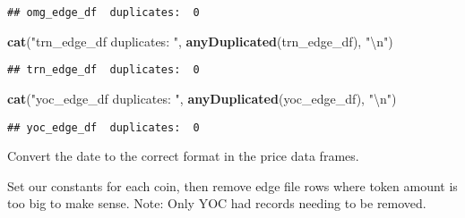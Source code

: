\documentclass[]{article}
\newenvironment{Shaded}{\begin{snugshade}}{\end{snugshade}}
\newcommand{\KeywordTok}[1]{\textcolor[rgb]{0.13,0.29,0.53}{\textbf{#1}}}
\newcommand{\DataTypeTok}[1]{\textcolor[rgb]{0.13,0.29,0.53}{#1}}
\newcommand{\CharTok}[1]{\textcolor[rgb]{0.31,0.60,0.02}{#1}}
\newcommand{\StringTok}[1]{\textcolor[rgb]{0.31,0.60,0.02}{#1}}
\newcommand{\OperatorTok}[1]{\textcolor[rgb]{0.81,0.36,0.00}{\textbf{#1}}}
\newcommand{\NormalTok}[1]{#1}
\begin{document}
\begin{verbatim}
## omg_edge_df  duplicates:  0
\end{verbatim}

\begin{Shaded}
\begin{Highlighting}[]
\KeywordTok{cat}\NormalTok{(}\StringTok{"trn_edge_df  duplicates: "}\NormalTok{, }\KeywordTok{anyDuplicated}\NormalTok{(trn_edge_df),  }\StringTok{"}\CharTok{\textbackslash{}n}\StringTok{"}\NormalTok{)}
\end{Highlighting}
\end{Shaded}

\begin{verbatim}
## trn_edge_df  duplicates:  0
\end{verbatim}

\begin{Shaded}
\begin{Highlighting}[]
\KeywordTok{cat}\NormalTok{(}\StringTok{"yoc_edge_df  duplicates: "}\NormalTok{, }\KeywordTok{anyDuplicated}\NormalTok{(yoc_edge_df),  }\StringTok{"}\CharTok{\textbackslash{}n}\StringTok{"}\NormalTok{)}
\end{Highlighting}
\end{Shaded}

\begin{verbatim}
## yoc_edge_df  duplicates:  0
\end{verbatim}

Convert the date to the correct format in the price data frames.

\begin{Shaded}
\end{Shaded}

Set our constants for each coin, then remove edge file rows where token
amount is too big to make sense. Note: Only YOC had records needing to
be removed.
\end{document}
